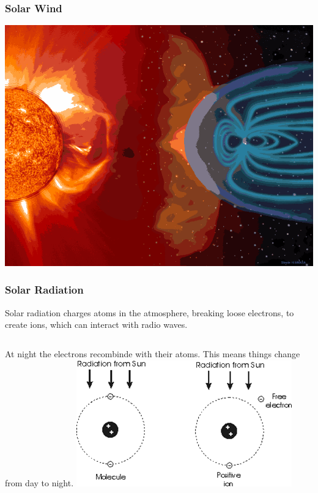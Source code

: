 \documentclass[10pt]{beamer}
\begin{document}
\begin{frame}
\frametitle{Solar Wind}
\begin{center}
\includegraphics[width=\textwidth]{magfield.png}
\end{center}
\end{frame}

\begin{frame}
\frametitle{Solar Radiation}
Solar radiation charges atoms in the atmosphere, breaking loose electrons, to create ions, which can interact with radio waves.\\
\begin{columns}
At night the electrons recombinde with their atoms. This means things change from day to night.
\includegraphics[width=\textwidth]{ions.png}
\end{columns}
\end{frame}
\end{document}
